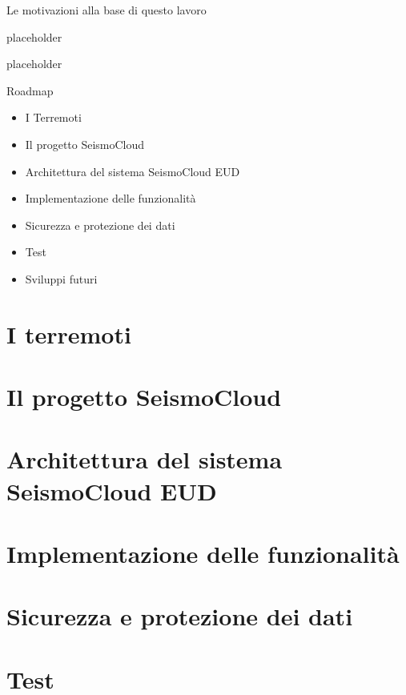 \begin{frame}[c]{Le motivazioni alla base di questo lavoro}

placeholder

\vspace{0.5cm}
placeholder

\end{frame}

\begin{frame}[c]{Roadmap}

\begin{itemize}
\item I Terremoti
\item Il progetto SeismoCloud
\item Architettura del sistema SeismoCloud EUD
\item Implementazione delle funzionalità
\item Sicurezza e protezione dei dati
\item Test
\item Sviluppi futuri
\end{itemize}

\end{frame}

\section{I terremoti}

\section{Il progetto SeismoCloud}

\section{Architettura del sistema SeismoCloud EUD}

\section{Implementazione delle funzionalità}

\section{Sicurezza e protezione dei dati}

\section{Test}

